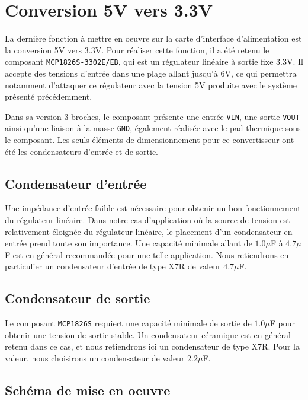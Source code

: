 	\newpage
				
	\section{Conversion 5V vers 3.3V}
	
	La dernière fonction à mettre en oeuvre sur la carte
	d'interface d'alimentation est la conversion 5V vers 3.3V.
	Pour réaliser cette fonction, il a été retenu le composant
	\texttt{MCP1826S-3302E/EB}, qui est un régulateur linéaire
	à sortie fixe 3.3V. Il accepte des tensions d'entrée dans une
	plage allant jusqu'à 6V, ce qui permettra notamment d'attaquer
	ce régulateur avec la tension 5V produite avec le système
	présenté précédemment.
	
	Dans sa version 3 broches, le composant présente une entrée
	\texttt{VIN}, une sortie \texttt{VOUT} ainsi qu'une liaison 
	à la masse \texttt{GND}, également réalisée avec le pad 
	thermique sous le composant. Les seuls éléments de dimensionnement
	pour ce convertisseur ont été les condensateurs d'entrée et de sortie.
	
		\subsection{Condensateur d'entrée}
		
		Une impédance d'entrée faible est nécessaire pour obtenir
		un bon fonctionnement du régulateur linéaire. Dans notre cas
		d'application où la source de tension est relativement
		éloignée du régulateur linéaire, le placement d'un condensateur
		en entrée prend toute son importance. Une capacité minimale
		allant de $1.0\mu$F à $4.7\mu$F est en général recommandée pour
		une telle application. Nous retiendrons en particulier un
		condensateur d'entrée de type X7R de valeur $4.7\mu$F.
		
		\subsection{Condensateur de sortie}
		
		Le composant \texttt{MCP1826S} requiert une capacité
		minimale de sortie de $1.0\mu$F pour obtenir une tension
		de sortie stable. Un condensateur céramique est en général
		retenu dans ce cas, et nous retiendrons ici un condensateur
		de type X7R. Pour la valeur, nous choisirons un condensateur
		de valeur $2.2\mu$F.
		
		\subsection{Schéma de mise en oeuvre}
		
